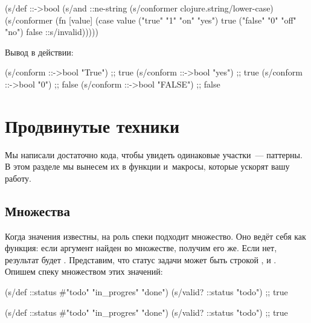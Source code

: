 \else


\begin{clojure}
(s/def ::->bool
  (s/and
   ::ne-string
   (s/conformer clojure.string/lower-case)
   (s/conformer
    (fn [value]
      (case value
        ("true" "1" "on" "yes") true
        ("false" "0" "off" "no") false
        ::s/invalid)))))

\end{clojure}


\fi

\noindent
Вывод в действии:


\begin{clojure}
(s/conform ::->bool "True")  ;; true
(s/conform ::->bool "yes")   ;; true
(s/conform ::->bool "0")     ;; false
(s/conform ::->bool "FALSE") ;; false
\end{clojure}


\section{Продвинутые техники}


Мы написали достаточно кода, чтобы увидеть одинаковые участки~--- паттерны. В
этом разделе мы вынесем их в функции и~макросы, которые ускорят вашу работу.

\subsection{Множества}


Когда значения известны, на роль спеки подходит множество. Оно ведёт себя как
функция: если аргумент найден во множестве, получим его же. Если нет, результат
будет . Представим, что статус задачи может быть строкой ,
 и . Опишем спеку множеством этих значений:

\ifnarrow


\begin{clojure}
(s/def ::status
  #{"todo" "in_progres" "done"})
(s/valid? ::status "todo") ;; true
\end{clojure}


\else


\begin{clojure}
(s/def ::status #{"todo" "in_progres" "done"})
(s/valid? ::status "todo") ;; true
\end{clojure}


\fi

